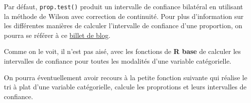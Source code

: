\documentclass[
  letterpaper,
  DIV=11,
  numbers=noendperiod,
  oneside]{scrreprt}
\begin{document}
Par défaut, \texttt{prop.test()} produit un intervalle de confiance
bilatéral en utilisant la méthode de Wilson avec correction de
continuité. Pour plus d'information sur les différentes manières de
calculer l'intervalle de confiance d'une proportion, on pourra se
référer à ce
\href{https://joseph.larmarange.net/Intervalle-de-confiance-bilateral}{billet
de blog}.

\begin{tcolorbox}[enhanced jigsaw, colbacktitle=quarto-callout-tip-color!10!white, opacityback=0, toprule=.15mm, colback=white, coltitle=black, bottomtitle=1mm, toptitle=1mm, titlerule=0mm, rightrule=.15mm, title=\textcolor{quarto-callout-tip-color}{\faLightbulb}\hspace{0.5em}{Astuce}, breakable, bottomrule=.15mm, opacitybacktitle=0.6, arc=.35mm, left=2mm, leftrule=.75mm, colframe=quarto-callout-tip-color-frame]

Comme on le voit, il n'est pas aisé, avec les fonctions de \textbf{R
base} de calculer les intervalles de confiance pour toutes les modalités
d'une variable catégorielle.

On pourra éventuellement avoir recours à la petite fonction suivante qui
réalise le tri à plat d'une variable catégorielle, calcule les
proprotions et leurs intervalles de confiance.


\end{tcolorbox}
\end{document}
